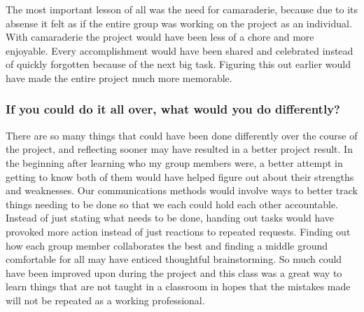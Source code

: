 The most important lesson of all was the need for camaraderie, because due to its absense  
it felt as if the entire group was working on the project as an individual. 
With camaraderie the project would have been less of a chore and more enjoyable. 
Every accomplishment would have been shared and celebrated instead of quickly forgotten 
because of the next big task. Figuring this out earlier would have made the entire 
project much more memorable.  \\

\subsubsection{If you could do it all over, what would you do differently?}

There are so many things that could have been done differently over the course of the 
project, and reflecting sooner may have resulted in a better project result. 
In the beginning after learning who my group members were, a better 
attempt in getting to know both of them  
would have helped figure out about their strengths and weaknesses. Our communications methods would 
involve ways to better track things needing to be done so that we each could hold
each other accountable. Instead of just stating what needs to be done, handing out tasks 
would have provoked more action instead of just reactions to repeated requests. 
Finding out how each group member collaborates the best and finding a middle ground 
comfortable for all may have enticed thoughtful brainstorming. So much could have 
been improved upon during the project and this class was a great way to learn 
things that are not taught in a classroom in hopes that the mistakes made will not be 
repeated as a working professional.  \\


